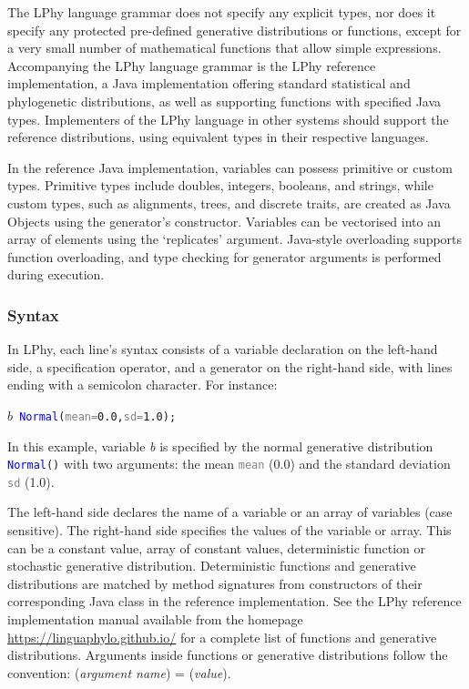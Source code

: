 \documentclass[10pt,letterpaper,table]{article}
\theoremstyle{definition}
\begin{document}
The LPhy language grammar does not specify any explicit types, nor does it specify any protected pre-defined generative distributions or functions, except for a very small number of mathematical functions that allow simple expressions. 
Accompanying the LPhy language grammar is the LPhy reference implementation, a Java implementation offering standard statistical and phylogenetic distributions, as well as supporting functions with specified Java types.
Implementers of the LPhy language in other systems should support the reference distributions, using equivalent types in their respective languages.

In the reference Java implementation, variables can possess primitive or custom types. 
Primitive types include doubles, integers, booleans, and strings, while custom types, such as alignments, trees, and discrete traits, are created as Java Objects using the generator's constructor. 
Variables can be vectorised into an array of elements using the `replicates' argument. 
Java-style overloading supports function overloading, and type checking for generator arguments is performed during execution.


\subsubsection{Syntax}
In LPhy, each line's syntax consists of a variable declaration on the left-hand side, a specification operator, and a generator on the right-hand side, with lines ending with a semicolon character. 
For instance:
{
  \small
  \begin{listing}
    \begin{alltt}
    \textcolor{bluishgreen}{\(b\)}  ~ \textcolor{blue}{Normal}(\textcolor{gray}{mean=} \textcolor{constant}{0.0}, \textcolor{gray}{sd=}\textcolor{constant}{1.0});
    \end{alltt}
  \end{listing}
}

In this example, variable \textit{\textcolor{bluishgreen}{b}} is specified by the normal generative distribution \texttt{\textcolor{blue}{Normal}()} with two arguments: the mean \texttt{\textcolor{gray}{mean}} (0.0) and the standard deviation \texttt{\textcolor{gray}{sd}} (1.0).

The left-hand side declares the name of a variable or an array of variables (case sensitive).
The right-hand side specifies the values of the variable or array. 
This can be a constant value, array of constant values, deterministic function or stochastic generative distribution.
Deterministic functions and generative distributions are matched by method signatures from constructors of their corresponding Java class in the reference implementation. 
See the LPhy reference implementation manual available from the homepage \url{https://linguaphylo.github.io/} for a complete list of functions and generative distributions. 
Arguments inside functions or generative distributions follow the convention: 
(\textit{argument name}) = (\textit{value}).
\end{document}
